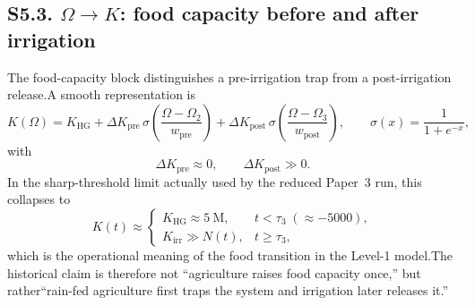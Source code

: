 \documentclass[11pt]{article}
\begin{document}
\subsection*{S5.3. $\Omega\rightarrow K$: food capacity before and after irrigation}\label{subsec:S5_to_K}
The food-capacity block distinguishes a pre-irrigation trap from a post-irrigation release.A smooth representation is
\begin{equation}K(\Omega)=K_{\mathrm{HG}}+\Delta K_{\mathrm{pre}}\,\sigma\!\left(\frac{\Omega-\Omega_2}{w_{\mathrm{pre}}}\right)+\Delta K_{\mathrm{post}}\,\sigma\!\left(\frac{\Omega-\Omega_3}{w_{\mathrm{post}}}\right),\qquad\sigma(x)=\frac{1}{1+e^{-x}},\tag{S5.6}\label{eq:S5_Ksmooth}\end{equation}
with
\begin{equation}\Delta K_{\mathrm{pre}}\approx 0,\qquad\Delta K_{\mathrm{post}}\gg 0.\tag{S5.7}\label{eq:S5_Ksteps}\end{equation}
In the sharp-threshold limit actually used by the reduced Paper~3 run, this collapses to
\begin{equation}K(t)\approx\begin{cases}K_{\mathrm{HG}}\approx 5\ \mathrm{M}, & t<\tau_3\;(\approx -5000),\\[4pt]K_{\mathrm{irr}}\gg N(t), & t\ge \tau_3,\end{cases}\tag{S5.8}\label{eq:S5_Kpiecewise}\end{equation}
which is the operational meaning of the food transition in the Level-1 model.The historical claim is therefore not ``agriculture raises food capacity once,'' but rather``rain-fed agriculture first traps the system and irrigation later releases it.''
\end{document}
